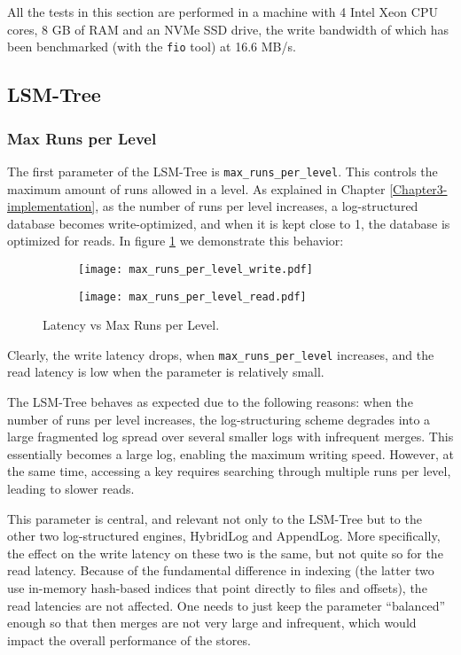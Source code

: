 All the tests in this section are performed in a machine with 4 Intel Xeon CPU cores, 8 GB of RAM and an NVMe SSD drive, the write bandwidth of which has been benchmarked (with the \verb|fio| tool) at 16.6 MB/s.

\subsection{LSM-Tree}

\subsubsection{Max Runs per Level}

The first parameter of the LSM-Tree is \verb"max_runs_per_level". This controls the maximum amount of runs allowed in a level. As explained in Chapter \ref{Chapter3-implementation}, as the number of runs per level increases, a log-structured database becomes write-optimized, and when it is kept close to 1, the database is optimized for reads. In figure \ref{fig:max-runs-per-level} we demonstrate this behavior:

\begin{figure}[h]
    \begin{subfigure}{.5\textwidth}
        \centering
        \texttt{[image: max\_runs\_per\_level\_write.pdf]}
    \end{subfigure}
    \begin{subfigure}{.5\textwidth}
        \centering
        \texttt{[image: max\_runs\_per\_level\_read.pdf]}
    \end{subfigure}
    \caption{Latency vs Max Runs per Level.}
    \label{fig:max-runs-per-level}
\end{figure}

Clearly, the write latency drops, when \verb"max_runs_per_level" increases, and the read latency is low when the parameter is relatively small.

The LSM-Tree behaves as expected due to the following reasons: when the number of runs per level increases, the log-structuring scheme degrades into a large fragmented log spread over several smaller logs with infrequent merges. This essentially becomes a large log, enabling the maximum writing speed. However, at the same time, accessing a key requires searching through multiple runs per level, leading to slower reads.

This parameter is central, and relevant not only to the LSM-Tree but to the other two log-structured engines, HybridLog and AppendLog. More specifically, the effect on the write latency on these two is the same, but not quite so for the read latency. Because of the fundamental difference in indexing (the latter two use in-memory hash-based indices that point directly to files and offsets), the read latencies are not affected. One needs to just keep the parameter ``balanced'' enough so that then merges are not very large and infrequent, which would impact the overall performance of the stores.


